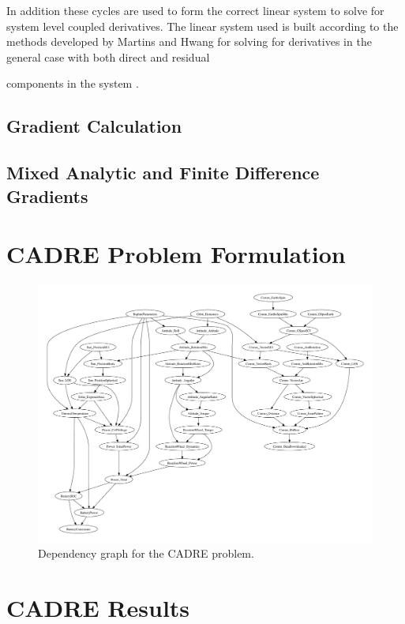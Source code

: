\documentclass[]{aiaa-tc} %
\begin{document}
    In addition these cycles are used to form the correct linear system to solve for system level coupled
    derivatives. The linear system used is built according to the methods developed by Martins and Hwang
    for solving for derivatives in the general case with both direct and residual

    components in the system \cite{Martins2012}.

    \subsection{Gradient Calculation}
    \subsection{Mixed Analytic and Finite Difference Gradients}

  \section{CADRE Problem Formulation}


    \begin{figure}[!htb]\begin{center}
      \includegraphics[width=1.1\textwidth]{images/CADRE.pdf}
      \caption{ Dependency graph for the CADRE problem. \label{fig:cadre_graph}}
    \end{center}\end{figure}

  \section{CADRE Results}
\end{document}
